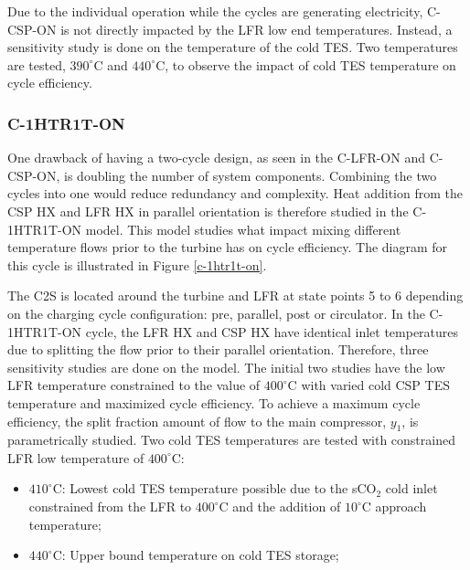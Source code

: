 \begin{paracol}{2}
\linenumbers
\switchcolumn

 Due to the individual operation while the cycles are generating electricity, C-CSP-ON is not directly impacted by the LFR low end temperatures. Instead, a sensitivity study is done on the temperature of the cold TES. Two temperatures are tested, $390^{\circ}$C and $440^{\circ}$C, to observe the impact of cold TES temperature on cycle efficiency. 


\subsubsection{C-1HTR1T-ON} 

One drawback of having a two-cycle design, as seen in the C-LFR-ON and C-CSP-ON, is doubling the number of system components. Combining the two cycles into one would reduce redundancy and complexity. Heat addition from the CSP HX and LFR HX in parallel orientation is therefore studied in the C-1HTR1T-ON model. This model studies what impact mixing different temperature flows prior to the turbine has on cycle efficiency. The diagram for this cycle is illustrated in Figure \ref{c-1htr1t-on}.


The C2S is located around the turbine and LFR at state points 5 to 6 depending on the charging cycle configuration: pre, parallel, post or circulator. In the C-1HTR1T-ON cycle, the LFR HX and CSP HX have identical inlet temperatures due to splitting the flow prior to their parallel orientation. Therefore, three sensitivity studies are done on the model. The initial two studies have the low LFR temperature constrained to the value of $400^{\circ}$C with varied cold CSP TES temperature and maximized cycle efficiency. To achieve a maximum cycle efficiency, the split fraction amount of flow to the main compressor, $y_{1}$, is parametrically studied.
Two cold TES temperatures are tested with constrained LFR low temperature of $400^{\circ}$C: 
\begin{itemize}
    \item	$410^{\circ}$C: Lowest cold TES temperature possible due to the sCO$_2$ cold inlet constrained from the LFR to $400^{\circ}$C and the addition of $10^{\circ}$C approach temperature;
    \item	$440^{\circ}$C: Upper bound temperature on cold TES storage;
\end{itemize}


\end{paracol}
